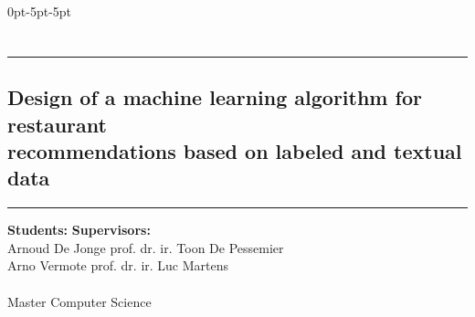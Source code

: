 {\titlespacing*{\chapter}
{0pt}{-5pt}{-5pt}\chapter[Summary]{}}
\rule{\linewidth}{0.5mm}
\hspace*{0pt}
\section*{Design of a machine learning algorithm for restaurant \\recommendations based on labeled and textual data}
\rule{\linewidth}{0.5mm}

\textbf{Students:}
\hfill
\textbf{Supervisors:} \\
Arnoud De Jonge
\hfill
prof. dr. ir. Toon De Pessemier \\
Arno Vermote
\hfill
prof. dr. ir. Luc Martens \\
\\
\hspace*{0pt}\hfill Master Computer Science


